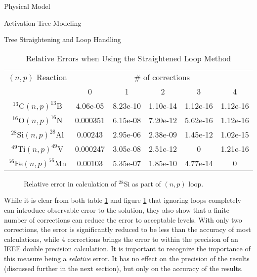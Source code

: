 \begin{chapter}{Physical Model\label{chap:physical}}
\begin{section}{Activation Tree Modeling\label{sec:physical.chains}}
\begin{subsection}{Tree Straightening and Loop Handling\label{sec:physical.chains.loops}}
    \begin{table}
      \begin{center}
        \caption{Relative Errors when Using the Straightened Loop
          Method}\label{tab:physical.loop_error}
        \begin{tabular}{|c|c|c|c|c|c|} \hline
          $(n,p)$ Reaction & \multicolumn{5}{c|}{\# of
            corrections}\\\cline{2-6}
          & 0 & 1 & 2 & 3 & 4 \\\hline\hline
          $^{13}$C$(n,p)^{13}$B & 4.06e-05 & 8.23e-10 & 1.10e-14 &
          1.12e-16 & 1.12e-16\\\hline
          $^{16}$O$(n,p)^{16}$N & 0.000351 & 6.15e-08 & 7.20e-12 &
          5.62e-16 & 1.12e-16 \\\hline
          $^{28}$Si$(n,p)^{28}$Al & 0.00243 & 2.95e-06 & 2.38e-09 &
          1.45e-12 & 1.02e-15 \\\hline
          $^{49}$Ti$(n,p)^{49}$V & 0.000247 & 3.05e-08 & 2.51e-12 & 0 &
          1.21e-16\\\hline
          $^{56}$Fe$(n,p)^{56}$Mn & 0.00103 & 5.35e-07 & 1.85e-10 &
          4.77e-14 & 0\\\hline\hline
        \end{tabular}
      \end{center}
    \end{table}
    
    \begin{figure}[htb]
      \begin{center}
        \leavevmode
        \caption{Relative error in calculation of $^{28}$Si as part of $(n,p)$ loop.}
        \label{fig:physical.loop_error}
      \end{center}
    \end{figure}

    While it is clear from both table \ref{tab:physical.loop_error}
    and figure \ref{fig:physical.loop_error} that ignoring loops
    completely can introduce observable error to the solution, they
    also show that a finite number of corrections can reduce the error
    to acceptable levels.  With only two corrections, the error is
    significantly reduced to be less than the accuracy of most
    calculations, while 4 corrections brings the error to within the
    precision of an IEEE double precision calculation.  It is
    important to recognize the importance of this measure being a
    \textsl{relative} error.  It has no effect on the precision of the
    results (discussed further in the next section), but only on the
    accuracy of the results.
    

\end{subsection}
\end{section}
\end{chapter}
